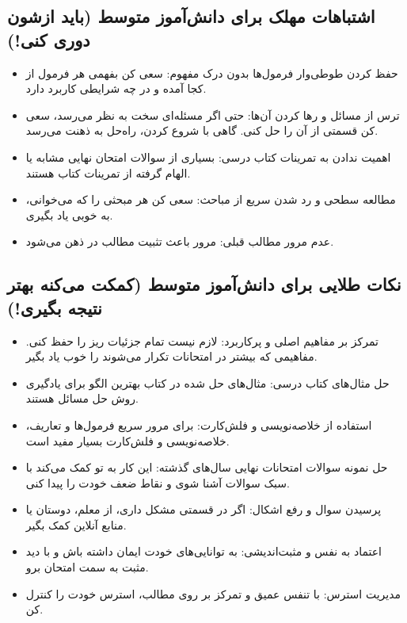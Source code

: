 \documentclass[12pt]{article}
\newcommand{\休息}[1]{\par\centering\textit{#1}\par\vspace{1ex}} %
\begin{document}
\subsection*{اشتباهات مهلک برای دانش‌آموز متوسط (باید ازشون دوری کنی!)}
\begin{itemize}
    \item حفظ کردن طوطی‌وار فرمول‌ها بدون درک مفهوم: سعی کن بفهمی هر فرمول از کجا آمده و در چه شرایطی کاربرد دارد.
    \item ترس از مسائل و رها کردن آن‌ها: حتی اگر مسئله‌ای سخت به نظر می‌رسد، سعی کن قسمتی از آن را حل کنی. گاهی با شروع کردن، راه‌حل به ذهنت می‌رسد.
    \item اهمیت ندادن به تمرینات کتاب درسی: بسیاری از سوالات امتحان نهایی مشابه یا الهام گرفته از تمرینات کتاب هستند.
    \item مطالعه سطحی و رد شدن سریع از مباحث: سعی کن هر مبحثی را که می‌خوانی، به خوبی یاد بگیری.
    \item عدم مرور مطالب قبلی: مرور باعث تثبیت مطالب در ذهن می‌شود.
\end{itemize}

\subsection*{نکات طلایی برای دانش‌آموز متوسط (کمکت می‌کنه بهتر نتیجه بگیری!)}
\begin{itemize}
    \item تمرکز بر مفاهیم اصلی و پرکاربرد: لازم نیست تمام جزئیات ریز را حفظ کنی. مفاهیمی که بیشتر در امتحانات تکرار می‌شوند را خوب یاد بگیر.
    \item حل مثال‌های کتاب درسی: مثال‌های حل شده در کتاب بهترین الگو برای یادگیری روش حل مسائل هستند.
    \item استفاده از خلاصه‌نویسی و فلش‌کارت: برای مرور سریع فرمول‌ها و تعاریف، خلاصه‌نویسی و فلش‌کارت بسیار مفید است.
    \item حل نمونه سوالات امتحانات نهایی سال‌های گذشته: این کار به تو کمک می‌کند با سبک سوالات آشنا شوی و نقاط ضعف خودت را پیدا کنی.
    \item پرسیدن سوال و رفع اشکال: اگر در قسمتی مشکل داری، از معلم، دوستان یا منابع آنلاین کمک بگیر.
    \item اعتماد به نفس و مثبت‌اندیشی: به توانایی‌های خودت ایمان داشته باش و با دید مثبت به سمت امتحان برو.
    \item مدیریت استرس: با تنفس عمیق و تمرکز بر روی مطالب، استرس خودت را کنترل کن.
\end{itemize}
\end{document}
